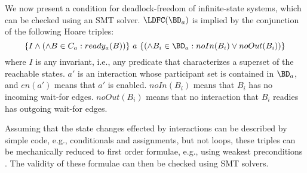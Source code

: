 We now present a condition for deadlock-freedom of infinite-state systems,
which can be checked using \eg an SMT solver.
$\LDFC(\BD_a)$ is implied by the conjunction of the following Hoare triples:
%
     $$\{ I \land (\land B \in C_a : ready_a(B)) \}\ a\ \{ (\land B_i \in \BD_a : noIn(B_i) \lor noOut(B_i)) \}$$ 
%
  where $I$ is any invariant, i.e., any predicate that characterizes a superset of the reachable
  states. $a'$ is an interaction whose participant set is contained in $\BD_a$, and $en(a')$ means that
  $a'$ is enabled. $noIn(B_i)$ means that $B_i$ has no incoming wait-for edges. $noOut(B_i)$ means
  that no interaction that $B_i$ readies has outgoing wait-for edges.

  Assuming that the state changes effected by interactions can be described by simple code,
  e.g., conditionals and assignments, but not loops, these triples can be mechanically reduced to
  first order formulae, e.g., using weakest preconditions \cite{Dij75}. The validity of these
  formulae can then be checked using SMT solvers.
